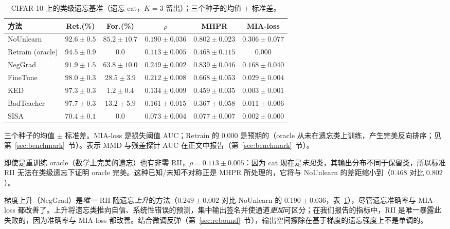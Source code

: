\begin{table}[t]
\centering
\small
\caption{CIFAR-10 上的类级遗忘基准（遗忘 cat，$K{=}3$ 留出）；三个种子的均值 $\pm$ 标准差。}\label{tab:benchmark}
\setlength{\tabcolsep}{3pt}
\begin{tabular}{l c c c c c}
\toprule
方法 & Ret.(\%) & For.(\%) & $\rho$ & MHPR & MIA-loss \\
\midrule
NoUnlearn & $92.6{\pm}0.5$ & $85.2{\pm}10.7$ & $0.190{\pm}0.036$ & $0.802{\pm}0.023$ & $0.306{\pm}0.077$ \\
Retrain (oracle) & $94.5{\pm}0.9$ & 0.0 & $0.113{\pm}0.005$ & $0.468{\pm}0.115$ & 0.000 \\
NegGrad & $91.9{\pm}1.5$ & $63.8{\pm}10.0$ & $\mathbf{0.249{\pm}0.002}$ & $0.839{\pm}0.046$ & $0.168{\pm}0.040$ \\
FineTune & $98.0{\pm}0.3$ & $28.5{\pm}3.9$ & $0.212{\pm}0.008$ & $0.668{\pm}0.053$ & $0.029{\pm}0.004$ \\
KED & $97.3{\pm}0.3$ & $1.2{\pm}0.4$ & $0.134{\pm}0.009$ & $0.459{\pm}0.035$ & $0.003{\pm}0.001$ \\
BadTeacher & $97.7{\pm}0.3$ & $13.2{\pm}5.9$ & $0.161{\pm}0.015$ & $0.367{\pm}0.058$ & $0.011{\pm}0.006$ \\
SISA & $70.4{\pm}0.1$ & 0.0 & $0.073{\pm}0.004$ & $0.077{\pm}0.007$ & $0.002{\pm}0.000$ \\
\bottomrule
\end{tabular}
\par\vspace{2pt}\footnotesize 三个种子的均值 $\pm$ 标准差。MIA-loss 是损失阈值 AUC；Retrain 的 $0.000$ 是预期的（oracle 从未在遗忘类上训练，产生完美反向排序；见第~\ref{sec:benchmark}~节）。表示 MMD 与残差探针 AUC 在正文中报告（第~\ref{sec:benchmark}~节）。
\end{table}

即使是重训练 oracle（数学上完美的遗忘）也有非零 RII，$\rho{=}0.113{\pm}0.005$：因为 cat 现在是\emph{未见}类，其输出分布不同于保留类，所以标准 RII 无法在类级遗忘下证明 oracle 完美。这种已知/未知不对称正是 MHPR 所处理的，它将与 NoUnlearn 的差距缩小到（$0.468$ 对比 $0.802$）。

梯度上升（NegGrad）是\emph{唯一} RII 随遗忘\emph{上升}的方法（$0.249{\pm}0.002$ 对比 NoUnlearn 的 $0.190{\pm}0.036$，表~\ref{tab:benchmark}），尽管遗忘准确率与 MIA-loss 都改善了。上升将遗忘类推向自信、系统性错误的预测，集中输出签名并使通道\emph{更加}可区分；在我们报告的指标中，RII 是唯一暴露此失败的，因为准确率与 MIA-loss 都改善。结合微调反弹（第~\ref{sec:rebound}~节），输出空间擦除在基于梯度的遗忘强度上不是单调的。

